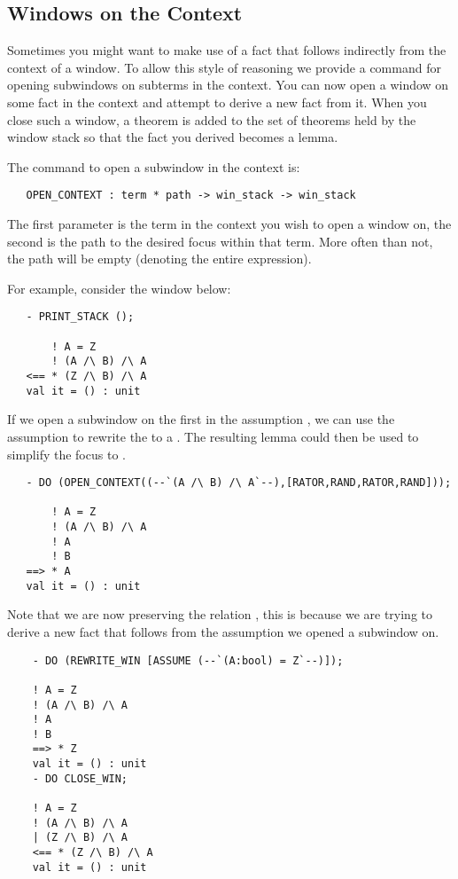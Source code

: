 \subsection{Windows on the Context}

Sometimes you might want to make use of a fact that follows indirectly from
the context of a window.
To allow this style of reasoning we provide a command for opening subwindows
on subterms in the context.
You can now open a window on some fact in the context and attempt to 
derive a new fact from it.
When you close such a window, a theorem is added to the set of theorems
held by the window stack so that the fact you derived becomes a lemma.

The command to open a subwindow in the context is:
\begin{boxed}\begin{verbatim}
   OPEN_CONTEXT : term * path -> win_stack -> win_stack
\end{verbatim}\end{boxed}
The first parameter is the term in the context you wish to open a window on,
the second is the path to the desired focus within that term.
More often than not, the path will be empty (denoting the entire expression).

For example, consider the window below:
\setcounter{sessioncount}{1}
\begin{session}\begin{verbatim}
   - PRINT_STACK ();
   
       ! A = Z
       ! (A /\ B) /\ A
   <== * (Z /\ B) /\ A
   val it = () : unit
\end{verbatim}\end{session}
If we open a subwindow on the first  in the assumption
, 
we can use the assumption  to rewrite the  to a .
The resulting lemma could then be used to simplify the focus to .
\begin{session}\begin{verbatim}
   - DO (OPEN_CONTEXT((--`(A /\ B) /\ A`--),[RATOR,RAND,RATOR,RAND]));
   
       ! A = Z
       ! (A /\ B) /\ A
       ! A
       ! B
   ==> * A
   val it = () : unit
\end{verbatim}\end{session}
Note that we are now preserving the relation ,
this is because we are trying to derive a new fact that follows from 
the assumption we opened a subwindow on.
\begin{session}\begin{verbatim}
    - DO (REWRITE_WIN [ASSUME (--`(A:bool) = Z`--)]);

	! A = Z
	! (A /\ B) /\ A
	! A
	! B
    ==> * Z
    val it = () : unit
    - DO CLOSE_WIN;

	! A = Z
	! (A /\ B) /\ A
	| (Z /\ B) /\ A
    <== * (Z /\ B) /\ A
    val it = () : unit
\end{verbatim}\end{session}

